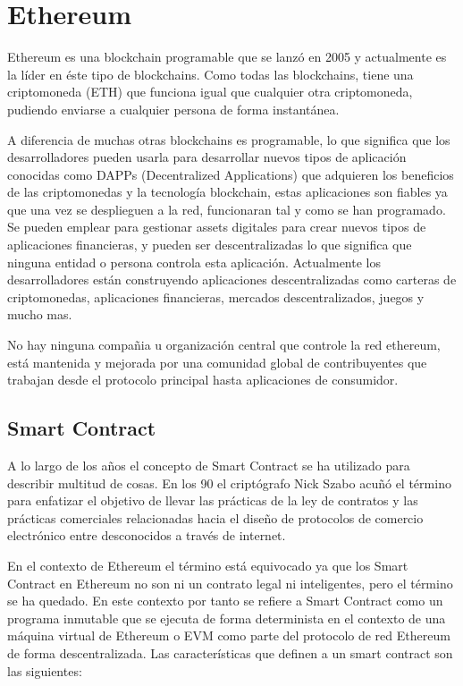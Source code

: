 \documentclass[12pt]{report}
\begin{document}
\section{Ethereum}
Ethereum es una blockchain programable que se lanzó en 2005 y actualmente es la líder en éste tipo de blockchains.
Como todas las blockchains, tiene una criptomoneda (ETH) que funciona igual que cualquier otra criptomoneda, pudiendo enviarse a cualquier persona de forma instantánea.

A diferencia de muchas otras blockchains es programable, lo que significa que los desarrolladores pueden usarla para desarrollar nuevos tipos de aplicación conocidas como DAPPs (Decentralized Applications) que adquieren los beneficios de las criptomonedas y la tecnología blockchain, estas aplicaciones son fiables ya que una vez se desplieguen a la red, funcionaran tal y como se han programado. Se pueden emplear para gestionar assets digitales para crear nuevos tipos de aplicaciones financieras, y pueden ser descentralizadas lo que significa que ninguna entidad o persona controla esta aplicación. Actualmente los desarrolladores están construyendo aplicaciones descentralizadas como carteras de criptomonedas, aplicaciones financieras, mercados descentralizados, juegos y mucho mas.

No hay ninguna compañia u organización central que controle la red ethereum, está mantenida y mejorada por una comunidad global de contribuyentes que trabajan desde el protocolo principal hasta aplicaciones de consumidor.

\subsection{Smart Contract}

A lo largo de los años el concepto de Smart Contract se ha utilizado para describir multitud de cosas. En los 90 el criptógrafo Nick Szabo acuñó el término para enfatizar el objetivo de llevar las prácticas de la ley de contratos y las prácticas comerciales relacionadas hacia el diseño de protocolos de comercio electrónico entre desconocidos a través de internet.

En el contexto de Ethereum el término está equivocado ya que los Smart Contract en Ethereum no son ni un contrato legal ni inteligentes, pero el término se ha quedado. En este contexto por tanto se refiere a Smart Contract como un programa inmutable que se ejecuta de forma determinista en el contexto de una máquina virtual de Ethereum o EVM como parte del protocolo de red Ethereum de forma descentralizada.
Las características que definen a un smart contract son las siguientes:
\end{document}
